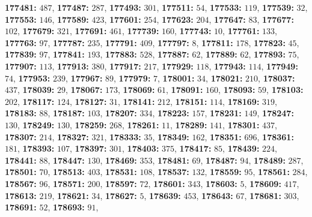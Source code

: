 \textsf{\bfseries 177481:} $487$, \textsf{\bfseries 177487:} $287$, \textsf{\bfseries 177493:} $301$, \textsf{\bfseries 177511:} $54$, \textsf{\bfseries 177533:} $119$, \textsf{\bfseries 177539:} $32$, \textsf{\bfseries 177553:} $146$, \textsf{\bfseries 177589:} $423$, \textsf{\bfseries 177601:} $254$, \textsf{\bfseries 177623:} $204$, \textsf{\bfseries 177647:} $83$, \textsf{\bfseries 177677:} $102$, \textsf{\bfseries 177679:} $321$, \textsf{\bfseries 177691:} $461$, \textsf{\bfseries 177739:} $160$, \textsf{\bfseries 177743:} $10$, \textsf{\bfseries 177761:} $133$, \textsf{\bfseries 177763:} $97$, \textsf{\bfseries 177787:} $235$, \textsf{\bfseries 177791:} $409$, \textsf{\bfseries 177797:} $8$, \textsf{\bfseries 177811:} $178$, \textsf{\bfseries 177823:} $45$, \textsf{\bfseries 177839:} $97$, \textsf{\bfseries 177841:} $193$, \textsf{\bfseries 177883:} $528$, \textsf{\bfseries 177887:} $62$, \textsf{\bfseries 177889:} $62$, \textsf{\bfseries 177893:} $75$, \textsf{\bfseries 177907:} $113$, \textsf{\bfseries 177913:} $380$, \textsf{\bfseries 177917:} $217$, \textsf{\bfseries 177929:} $118$, \textsf{\bfseries 177943:} $114$, \textsf{\bfseries 177949:} $74$, \textsf{\bfseries 177953:} $239$, \textsf{\bfseries 177967:} $89$, \textsf{\bfseries 177979:} $7$, \textsf{\bfseries 178001:} $34$, \textsf{\bfseries 178021:} $210$, \textsf{\bfseries 178037:} $437$, \textsf{\bfseries 178039:} $29$, \textsf{\bfseries 178067:} $173$, \textsf{\bfseries 178069:} $61$, \textsf{\bfseries 178091:} $160$, \textsf{\bfseries 178093:} $59$, \textsf{\bfseries 178103:} $202$, \textsf{\bfseries 178117:} $124$, \textsf{\bfseries 178127:} $31$, \textsf{\bfseries 178141:} $212$, \textsf{\bfseries 178151:} $114$, \textsf{\bfseries 178169:} $319$, \textsf{\bfseries 178183:} $88$, \textsf{\bfseries 178187:} $103$, \textsf{\bfseries 178207:} $334$, \textsf{\bfseries 178223:} $157$, \textsf{\bfseries 178231:} $149$, \textsf{\bfseries 178247:} $130$, \textsf{\bfseries 178249:} $130$, \textsf{\bfseries 178259:} $268$, \textsf{\bfseries 178261:} $11$, \textsf{\bfseries 178289:} $141$, \textsf{\bfseries 178301:} $437$, \textsf{\bfseries 178307:} $214$, \textsf{\bfseries 178327:} $321$, \textsf{\bfseries 178333:} $35$, \textsf{\bfseries 178349:} $162$, \textsf{\bfseries 178351:} $696$, \textsf{\bfseries 178361:} $181$, \textsf{\bfseries 178393:} $107$, \textsf{\bfseries 178397:} $301$, \textsf{\bfseries 178403:} $375$, \textsf{\bfseries 178417:} $85$, \textsf{\bfseries 178439:} $224$, \textsf{\bfseries 178441:} $88$, \textsf{\bfseries 178447:} $130$, \textsf{\bfseries 178469:} $353$, \textsf{\bfseries 178481:} $69$, \textsf{\bfseries 178487:} $94$, \textsf{\bfseries 178489:} $287$, \textsf{\bfseries 178501:} $70$, \textsf{\bfseries 178513:} $403$, \textsf{\bfseries 178531:} $108$, \textsf{\bfseries 178537:} $132$, \textsf{\bfseries 178559:} $95$, \textsf{\bfseries 178561:} $284$, \textsf{\bfseries 178567:} $96$, \textsf{\bfseries 178571:} $200$, \textsf{\bfseries 178597:} $72$, \textsf{\bfseries 178601:} $343$, \textsf{\bfseries 178603:} $5$, \textsf{\bfseries 178609:} $417$, \textsf{\bfseries 178613:} $219$, \textsf{\bfseries 178621:} $34$, \textsf{\bfseries 178627:} $5$, \textsf{\bfseries 178639:} $453$, \textsf{\bfseries 178643:} $67$, \textsf{\bfseries 178681:} $303$, \textsf{\bfseries 178691:} $52$, \textsf{\bfseries 178693:} $91$, 
